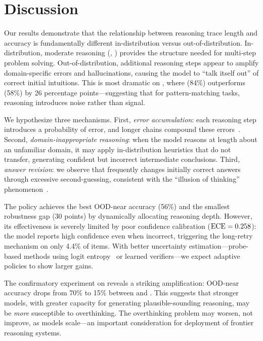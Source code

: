\section{Discussion}
\label{sec:discussion}

Our results demonstrate that the relationship between reasoning trace length and accuracy is fundamentally different in-distribution versus out-of-distribution. In-distribution, moderate reasoning (\pshort, \pmedium) provides the structure needed for multi-step problem solving. Out-of-distribution, additional reasoning steps appear to amplify domain-specific errors and hallucinations, causing the model to ``talk itself out'' of correct initial intuitions. This is most dramatic on \csqa, where \pnone (84\%) outperforms \plong (58\%) by 26 percentage points---suggesting that for pattern-matching tasks, reasoning introduces noise rather than signal.

We hypothesize three mechanisms. First, \emph{error accumulation}: each reasoning step introduces a probability of error, and longer chains compound these errors~\citep{wang2024nora}. Second, \emph{domain-inappropriate reasoning}: when the model reasons at length about an unfamiliar domain, it may apply in-distribution heuristics that do not transfer, generating confident but incorrect intermediate conclusions. Third, \emph{answer revision}: we observe that \plong frequently changes initially correct answers through excessive second-guessing, consistent with the ``illusion of thinking'' phenomenon~\citep{shojaee2025illusion}.

The \padaptive policy achieves the best OOD-near accuracy (56\%) and the smallest robustness gap (30 points) by dynamically allocating reasoning depth. However, its effectiveness is severely limited by poor confidence calibration ($\text{ECE} = 0.258$): the model reports high confidence even when incorrect, triggering the long-retry mechanism on only 4.4\% of items. With better uncertainty estimation---\eg probe-based methods using logit entropy~\citep{ballon2026trajectories} or learned verifiers---we expect adaptive policies to show larger gains.

The confirmatory experiment on \mini reveals a striking amplification: OOD-near accuracy drops from 70\% to 15\% between \pshort and \plong. This suggests that stronger models, with greater capacity for generating plausible-sounding reasoning, may be \emph{more} susceptible to overthinking. The overthinking problem may worsen, not improve, as models scale---an important consideration for deployment of frontier reasoning systems.

